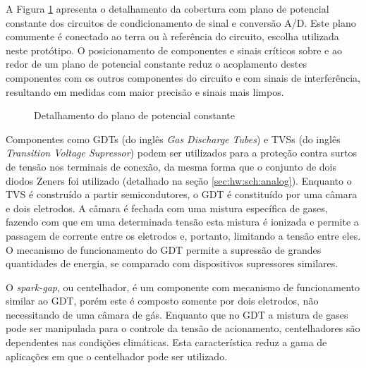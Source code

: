 			A Figura \ref{img:proto:gerber:gndplane} apresenta o detalhamento da cobertura com plano de potencial constante dos circuitos de condicionamento de sinal e conversão A/D. Este plano comumente é conectado ao terra ou à referência do circuito, escolha utilizada neste protótipo. O posicionamento de componentes e sinais críticos sobre e ao redor de um plano de potencial constante reduz o acoplamento destes componentes com os outros componentes do circuito e com sinais de interferência, resultando em medidas com maior precisão e sinais mais limpos.

			\begin{figure}
				\caption{Detalhamento do plano de potencial constante}
				\label{img:proto:gerber:gndplane}
				\centering
			\end{figure}

			Componentes como GDTs (do inglês \textit{Gas Discharge Tubes}) e TVSs (do inglês \textit{Transition Voltage Supressor}) podem ser utilizados para a proteção contra surtos de tensão nos terminais de conexão, da mesma forma que o conjunto de dois diodos Zeners foi utilizado (detalhado na seção \ref{sec:hw:sch:analog}). Enquanto o TVS é construído a partir semicondutores, o GDT é constituído por uma câmara e dois eletrodos. A câmara é fechada com uma mistura específica de gases, fazendo com que em uma determinada tensão esta mistura é ionizada e permite a passagem de corrente entre os eletrodos e, portanto, limitando a tensão entre eles. O mecanismo de funcionamento do GDT permite a supressão de grandes quantidades de energia, se comparado com dispositivos supressores similares.

			O \textit{spark-gap}, ou centelhador, é um componente com mecanismo de funcionamento similar ao GDT, porém este é composto somente por dois eletrodos, não necessitando de uma câmara de gás. Enquanto que no GDT a mistura de gases pode ser manipulada para o controle da tensão de acionamento, centelhadores são dependentes nas condições climáticas. Esta característica reduz a gama de aplicações em que o centelhador pode ser utilizado.

